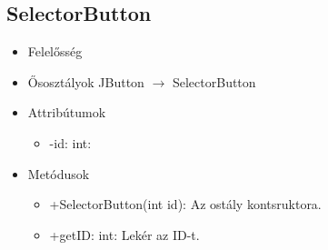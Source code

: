 \subsection{SelectorButton}
\begin{itemize}
	\item Felelősség\newline
	\item Ősosztályok\newline
		JButton $\rightarrow$ SelectorButton
	\item Attribútumok\newline
	\begin{itemize}
		\item -id: int: 
	\end{itemize}
	\item Metódusok\newline
	\begin{itemize}
		\item +SelectorButton(int id): Az ostály kontsruktora.
		\item +getID: int: Lekér az ID-t.
	\end{itemize}
\end{itemize}






